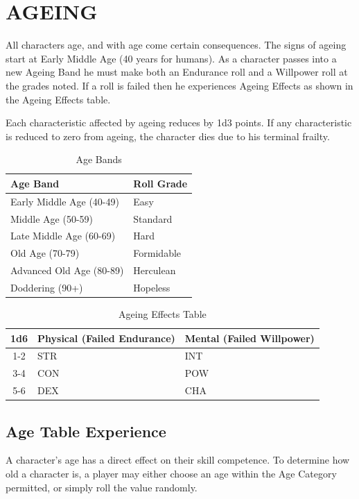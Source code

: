 \documentclass[10pt]{article}
\begin{document}
\section{AGEING}
\label{sec:ageing}
All characters age, and with age come certain consequences. The signs of ageing start at Early Middle Age (40 years for humans). As a character passes into a new Ageing Band he must make both an Endurance roll and a Willpower roll at the grades noted. If a roll is failed then he experiences Ageing Effects as shown in the Ageing Effects table.

Each characteristic affected by ageing reduces by 1d3 points. If any characteristic is reduced to zero from ageing, the character dies due to his terminal frailty.

\begin{table}[h]
\centering
\caption{Age Bands}
\label{tab:age-bands}
\begin{tabular}{ll}
\toprule
\textbf{Age Band} & \textbf{Roll Grade} \\
\midrule
Early Middle Age (40-49) & Easy \\
Middle Age (50-59) & Standard \\
Late Middle Age (60-69) & Hard \\
Old Age (70-79) & Formidable \\
Advanced Old Age (80-89) & Herculean \\
Doddering (90+) & Hopeless \\
\bottomrule
\end{tabular}
\end{table}

\begin{table}[h]
\centering
\caption{Ageing Effects Table}
\label{tab:ageing-effects}
\begin{tabular}{cll}
\toprule
\textbf{1d6} & \textbf{Physical (Failed Endurance)} & \textbf{Mental (Failed Willpower)} \\
\midrule
1-2 & STR & INT \\
3-4 & CON & POW \\
5-6 & DEX & CHA \\
\bottomrule
\end{tabular}
\end{table}

\subsection{Age Table Experience}
\label{subsec:age-table}
A character's age has a direct effect on their skill competence. To determine how old a character is, a player may either choose an age within the Age Category permitted, or simply roll the value randomly.
\end{document}
